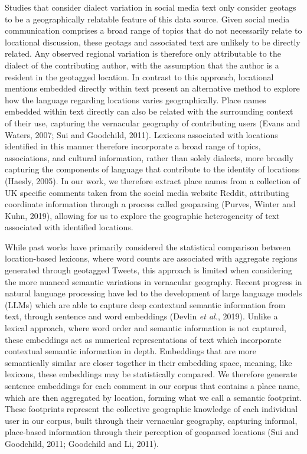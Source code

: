 \documentclass[
  letterpaper,
  11pt,
  english,
  onehalfspacing,
  headsepline]{MastersDoctoralThesis}
\begin{document}
Studies that consider dialect variation in social media text only
consider geotags to be a geographically relatable feature of this data
source. Given social media communication comprises a broad range of
topics that do not necessarily relate to locational discussion, these
geotags and associated text are unlikely to be directly related. Any
observed regional variation is therefore only attributable to the
dialect of the contributing author, with the assumption that the author
is a resident in the geotagged location. In contrast to this approach,
locational mentions embedded directly within text present an alternative
method to explore how the language regarding locations varies
geographically. Place names embedded within text directly can also be
related with the surrounding context of their use, capturing the
vernacular geography of contributing users (Evans and Waters, 2007; Sui
and Goodchild, 2011). Lexicons associated with locations identified in
this manner therefore incorporate a broad range of topics, associations,
and cultural information, rather than solely dialects, more broadly
capturing the components of language that contribute to the identity of
locations (Haesly, 2005). In our work, we therefore extract place names
from a collection of UK specific comments taken from the social media
website Reddit, attributing coordinate information through a process
called geoparsing (Purves, Winter and Kuhn, 2019), allowing for us to
explore the geographic heterogeneity of text associated with identified
locations.

While past works have primarily considered the statistical comparison
between location-based lexicons, where word counts are associated with
aggregate regions generated through geotagged Tweets, this approach is
limited when considering the more nuanced semantic variations in
vernacular geography. Recent progress in natural language processing
have led to the development of large language models (LLMs) which are
able to capture deep contextual semantic information from text, through
sentence and word embeddings (Devlin \emph{et al.}, 2019). Unlike a
lexical approach, where word order and semantic information is not
captured, these embeddings act as numerical representations of text
which incorporate contextual semantic information in depth. Embeddings
that are more semantically similar are closer together in their
embedding space, meaning, like lexicons, these embeddings may be
statistically compared. We therefore generate sentence embeddings for
each comment in our corpus that contains a place name, which are then
aggregated by location, forming what we call a semantic footprint. These
footprints represent the collective geographic knowledge of each
individual user in our corpus, built through their vernacular geography,
capturing informal, place-based information through their perception of
geoparsed locations (Sui and Goodchild, 2011; Goodchild and Li, 2011).
\end{document}
